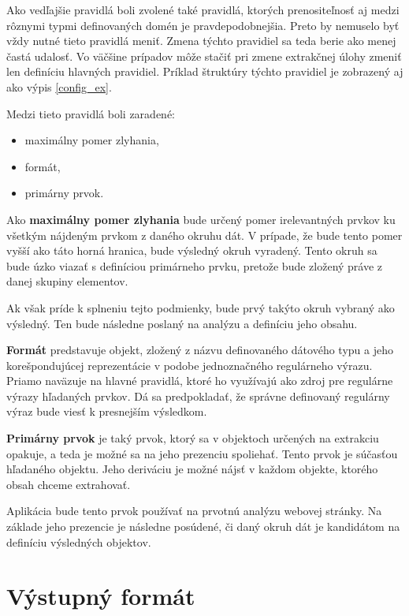 Ako vedľajšie pravidlá boli zvolené také pravidlá, ktorých prenositeľnosť aj medzi rôznymi typmi definovaných domén je pravdepodobnejšia. Preto by nemuselo byť vždy nutné tieto pravidlá meniť. Zmena týchto pravidiel sa teda berie ako menej častá udalosť. Vo väčšine prípadov môže stačiť pri zmene extrakčnej úlohy zmeniť len definíciu hlavných pravidiel. Príklad štruktúry týchto pravidiel je zobrazený aj ako výpis \ref{config_ex}.

Medzi tieto pravidlá boli zaradené:
\begin{itemize}
    \item maximálny pomer zlyhania,
    \item formát,
    \item primárny prvok.
\end{itemize}

\bigskip

Ako \textbf{maximálny pomer zlyhania} bude určený pomer irelevantných prvkov ku všetkým nájdeným prvkom z daného okruhu dát. V prípade, že bude tento pomer vyšší ako táto horná hranica, bude výsledný okruh vyradený. Tento okruh sa bude úzko viazať s definíciou primárneho prvku, pretože bude zložený práve z danej skupiny elementov. 

Ak však príde k splneniu tejto podmienky, bude prvý takýto okruh vybraný ako výsledný. Ten bude následne poslaný na analýzu a definíciu jeho obsahu. 

\bigskip

\textbf{Formát} predstavuje objekt, zložený z názvu definovaného dátového typu a jeho korešpondujúcej reprezentácie v podobe jednoznačného regulárneho výrazu. Priamo naväzuje na hlavné pravidlá, ktoré ho využívajú ako zdroj pre regulárne výrazy hľadaných prvkov. Dá sa predpokladať, že správne definovaný regulárny výraz bude viesť k presnejším výsledkom. 

\bigskip

\textbf{Primárny prvok} je taký prvok, ktorý sa v objektoch určených na extrakciu opakuje, a teda je možné sa na jeho prezenciu spoliehať. Tento prvok je súčasťou hľadaného objektu. Jeho deriváciu je možné nájsť v každom objekte, ktorého obsah chceme extrahovať. 

Aplikácia bude tento prvok používať na prvotnú analýzu webovej stránky. Na základe jeho prezencie je následne posúdené, či daný okruh dát je kandidátom na definíciu výsledných objektov.

\newpage

\section{Výstupný formát}

